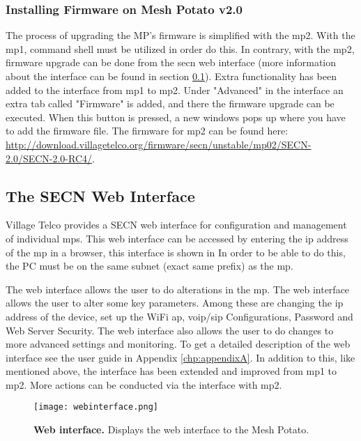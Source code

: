 \subsubsection{Installing Firmware on Mesh Potato v2.0}
The process of upgrading the MP's firmware is simplified with the \gls{mp2}. With the \gls{mp1}, command shell must be utilized in order do this. In contrary, with the \gls{mp2}, firmware upgrade can be done from the \gls{secn} web interface (more information about the interface can be found in section \ref{subsec:interface}). Extra functionality has been added to the interface from \gls{mp1} to \gls{mp2}. Under "Advanced" in the interface an extra tab called "Firmware" is added, and there the firmware upgrade can be executed. When this button is pressed, a new windows pops up where you have to add the firmware file. The firmware for \gls{mp2} can be found here: \url{http://download.villagetelco.org/firmware/secn/unstable/mp02/SECN-2.0/SECN-2.0-RC4/}.

\subsection{The SECN Web Interface}
\label{subsec:interface}
Village Telco provides a SECN web interface for configuration and management of individual \glspl{mp}. This web interface can be accessed by entering the \gls{ip} address of the \gls{mp} in a browser, this interface is shown in  In order to be able to do this, the PC must be on the same subnet (exact same prefix) as the \gls{mp}.  

The web interface allows the user to do alterations in the \gls{mp}. The web interface allows the user to alter some key parameters. Among these are changing the \gls{ip} address of the device, set up the WiFi \gls{ap}, \gls{voip}/\gls{sip} Configurations, Password and Web Server Security. The web interface also allows the user to do changes to more advanced settings and monitoring. To get a detailed description of the web interface see the user guide in Appendix \ref{chp:appendixA}. In addition to this, like mentioned above, the interface has been extended and improved from \gls{mp1} to \gls{mp2}. More actions can be conducted via the interface with \gls{mp2}. 

\begin{figure}[t]
  \centering
      \texttt{[image: webinterface.png]}
  \caption [Web interface]{\textbf{Web interface.} Displays the web interface to the Mesh Potato.}
  \label{fig:webinterface}
\end{figure}

